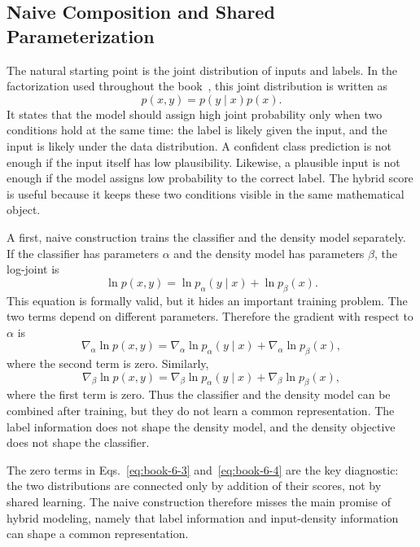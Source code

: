 \documentclass[runningheads]{llncs}
\begin{document}
\subsection{Naive Composition and Shared Parameterization}

The natural starting point is the joint distribution of inputs and labels. In
the factorization used throughout the book~\cite{tomczak2024deep}, this joint
distribution is written as
\begin{equation}
p(x,y)=p(y\mid x)p(x).
\tag{6.1}
\label{eq:book-6-1}
\end{equation}
It states that the model should assign high joint probability only
when two conditions hold at the same time: the label is likely given the input,
and the input is likely under the data distribution. A confident class
prediction is not enough if the input itself has low plausibility. Likewise, a
plausible input is not enough if the model assigns low probability to the
correct label. The hybrid score is useful because it keeps these two conditions
visible in the same mathematical object.

A first, naive construction trains the classifier and the density model
separately. If the classifier has parameters \(\alpha\) and the density model has
parameters \(\beta\), the log-joint is
\begin{equation}
\ln p(x,y)
=
\ln p_{\alpha}(y\mid x)+\ln p_{\beta}(x).
\tag{6.2}
\label{eq:book-6-2}
\end{equation}
This equation is formally valid, but it hides an important training problem. The
two terms depend on different parameters. Therefore the gradient with respect to
\(\alpha\) is
\begin{equation}
\nabla_{\alpha}\ln p(x,y)
=
\nabla_{\alpha}\ln p_{\alpha}(y\mid x)
+
\nabla_{\alpha}\ln p_{\beta}(x),
\tag{6.3}
\label{eq:book-6-3}
\end{equation}
where the second term is zero. Similarly,
\begin{equation}
\nabla_{\beta}\ln p(x,y)
=
\nabla_{\beta}\ln p_{\alpha}(y\mid x)
+
\nabla_{\beta}\ln p_{\beta}(x),
\tag{6.4}
\label{eq:book-6-4}
\end{equation}
where the first term is zero. Thus the classifier and the density model can be
combined after training, but they do not learn a common representation. The label
information does not shape the density model, and the density objective does not
shape the classifier.

The zero terms in Eqs.~\eqref{eq:book-6-3} and~\eqref{eq:book-6-4} are the key
diagnostic: the two distributions are connected only by addition of their scores,
not by shared learning. The naive construction therefore misses the main promise
of hybrid modeling, namely that label information and input-density information
can shape a common representation.
\end{document}
